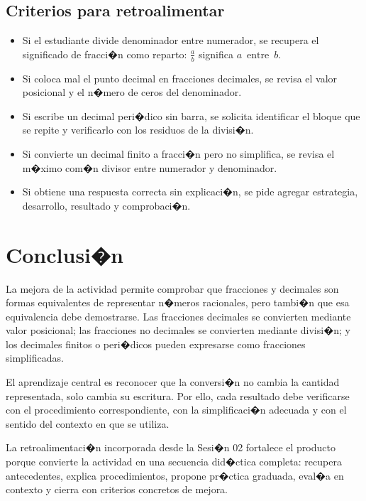 \documentclass[
	spanish,
	letterpaper, oneside
]{article}
\newcommand{\DivOp}[2]{\ensuremath{#1\,\mbox{ entre }\,#2}}
\begin{document}
\subsection{Criterios para retroalimentar}

\begin{itemize}
	\item Si el estudiante divide denominador entre numerador, se recupera el significado de fracci�n como reparto: $\frac{a}{b}$ significa \DivOp{a}{b}.
	\item Si coloca mal el punto decimal en fracciones decimales, se revisa el valor posicional y el n�mero de ceros del denominador.
	\item Si escribe un decimal peri�dico sin barra, se solicita identificar el bloque que se repite y verificarlo con los residuos de la divisi�n.
	\item Si convierte un decimal finito a fracci�n pero no simplifica, se revisa el m�ximo com�n divisor entre numerador y denominador.
	\item Si obtiene una respuesta correcta sin explicaci�n, se pide agregar estrategia, desarrollo, resultado y comprobaci�n.
\end{itemize}

\section{Conclusi�n}

La mejora de la actividad permite comprobar que fracciones y decimales son formas equivalentes de representar n�meros racionales, pero tambi�n que esa equivalencia debe demostrarse. Las fracciones decimales se convierten mediante valor posicional; las fracciones no decimales se convierten mediante divisi�n; y los decimales finitos o peri�dicos pueden expresarse como fracciones simplificadas.

El aprendizaje central es reconocer que la conversi�n no cambia la cantidad representada, solo cambia su escritura. Por ello, cada resultado debe verificarse con el procedimiento correspondiente, con la simplificaci�n adecuada y con el sentido del contexto en que se utiliza.

La retroalimentaci�n incorporada desde la Sesi�n 02 fortalece el producto porque convierte la actividad en una secuencia did�ctica completa: recupera antecedentes, explica procedimientos, propone pr�ctica graduada, eval�a en contexto y cierra con criterios concretos de mejora.
\end{document}
